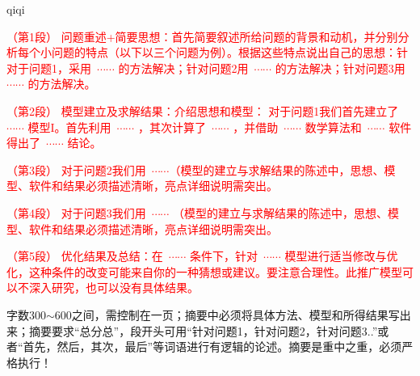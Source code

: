 qiqi

{\song\xiaosihao
\setlength{\parindent}{2em}\textcolor{red}{（第1段）	问题重述+简要思想：首先简要叙述所给问题的背景和动机，并分别分析每个小问题的特点（以下以三个问题为例）。根据这些特点说出自己的思想：针对于问题1，采用~$\cdots \cdots$ 的方法解决；针对问题2用~$\cdots \cdots$ 的方法解决；针对问题3用~$\cdots \cdots$ 的方法解决。}


\setlength{\parindent}{2em}\textcolor{red}{（第2段）	模型建立及求解结果：介绍思想和模型： 对于问题1我们首先建立了~$\cdots \cdots$ 模型I。首先利用~$\cdots \cdots$ ，其次计算了~$\cdots \cdots$ ，并借助~$\cdots \cdots$ 数学算法和~$\cdots \cdots$ 软件得出了~$\cdots \cdots$ 结论。}

\setlength{\parindent}{2em} \textcolor{red}{（第3段）	对于问题2我们用~$\cdots \cdots$（模型的建立与求解结果的陈述中，思想、模型、软件和结果必须描述清晰，亮点详细说明需突出。}

\setlength{\parindent}{2em}\textcolor{red}{（第4段）	对于问题3我们用~$\cdots \cdots$ （模型的建立与求解结果的陈述中，思想、模型、软件和结果必须描述清晰，亮点详细说明需突出。}

\setlength{\parindent}{2em}\textcolor{red}{（第5段）	优化结果及总结：在~$\cdots \cdots$ 条件下，针对~$\cdots \cdots$ 模型进行适当修改与优化，这种条件的改变可能来自你的一种猜想或建议。要注意合理性。此推广模型可以不深入研究，也可以没有具体结果。}
}

\begin{rmk}
字数300$\sim $600之间，需控制在一页；摘要中必须将具体方法、模型和所得结果写出来；摘要要求“总分总”，段开头可用“针对问题1，针对问题2，针对问题3..”或者“首先，然后，其次，最后”等词语进行有逻辑的论述。摘要是重中之重，必须严格执行！
\end{rmk}





